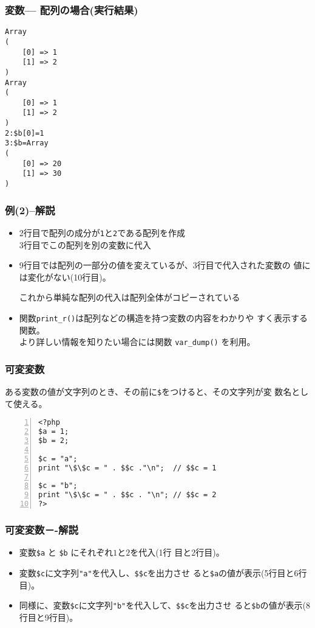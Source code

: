 \begin{frame}[containsverbatim]
 \frametitle{変数--- 配列の場合(実行結果)}
\begin{Verbatim}
Array
(
    [0] => 1
    [1] => 2
)
Array
(
    [0] => 1
    [1] => 2
)
2:$b[0]=1
3:$b=Array
(
    [0] => 20
    [1] => 30
)
\end{Verbatim}
\end{frame}
 \begin{frame}[containsverbatim]
  \frametitle{例(2)--解説}
 \begin{itemize}
 \item 2行目で配列の成分が\texttt{1}と\texttt{2}である配列を作成\\
       3行目でこの配列を別の変数に代入
 \item 9行目では配列の一部分の値を変えているが、3行目で代入された変数の
       値には変化がない(10行目)。

       これから単純な配列の代入は配列全体がコピーされている
 \item 関数\texttt{print\_r()}は配列などの構造を持つ変数の内容をわかりや
 すく表示する関数。\\より詳しい情報を知りたい場合には関数
       \verb+var_dump()+ を利用。
\end{itemize}
 \end{frame}
 \begin{frame}[containsverbatim]
  \frametitle{可変変数}
ある変数の値が文字列のとき、その前に\verb+$+をつけると、その文字列が変
  数名として使える。
\begin{Verbatim}[numbers=left, fontsize=\small]
<?php
$a = 1;
$b = 2;

$c = "a";
print "\$\$c = " . $$c ."\n";  // $$c = 1

$c = "b";
print "\$\$c = " . $$c . "\n"; // $$c = 2
?>
\end{Verbatim}
 \end{frame}
 \begin{frame}[containsverbatim]
  \frametitle{可変変数－-解説}
  \begin{itemize}\upshape
   \item 変数\verb+$a+ と \verb+$b+ にそれぞれ$1$と$2$を代入(1行
         目と2行目)。
   \item 変数\verb+$c+に文字列\verb+"a"+を代入し、\verb+$$c+を出力させ
         ると\verb+$a+の値が表示(5行目と6行目)。
   \item 同様に、変数\verb+$c+に文字列\verb+"b"+を代入して、\verb+$$c+を出力させ
         ると\verb+$b+の値が表示(8行目と9行目)。
  \end{itemize}
 \end{frame}
